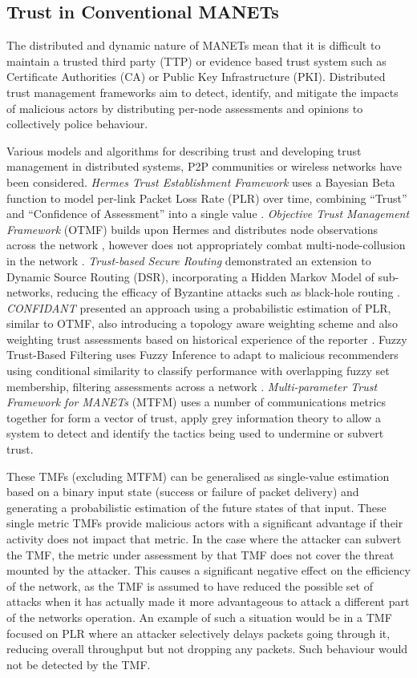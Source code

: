 \documentclass{aamas2016}
\begin{document}
\subsection{Trust in Conventional MANETs}
The distributed and dynamic nature of MANETs mean that it is difficult to maintain a trusted third party (TTP) or evidence based trust system such as Certificate Authorities (CA) or Public Key Infrastructure (PKI). 
Distributed trust management frameworks aim to detect, identify, and mitigate the impacts of malicious actors by distributing per-node assessments and opinions to collectively police behaviour. 

Various models and algorithms for describing trust and developing trust management in distributed systems, P2P communities or wireless networks have been considered.
\textit{Hermes Trust Establishment Framework} uses a Bayesian Beta function to model per-link Packet Loss Rate (PLR) over time, combining ``Trust'' and ``Confidence of Assessment'' into a single value \cite{Zouridaki2005}.
\textit{Objective Trust Management Framework} (OTMF) builds upon Hermes and distributes node observations across the network \cite{Li2008}, however does not appropriately combat multi-node-collusion in the network \cite{Cho2011}. 
\textit{Trust-based Secure Routing} demonstrated an extension to Dynamic Source Routing (DSR), incorporating a Hidden Markov Model of sub-networks, reducing the efficacy of Byzantine attacks such as black-hole routing  \cite{Moe2008a}. 
\textit{CONFIDANT} presented an approach using a probabilistic estimation of PLR, similar to OTMF, also introducing a topology aware weighting scheme and also weighting trust assessments based on historical experience of the reporter \cite{Buchegger2002}. Fuzzy Trust-Based Filtering uses Fuzzy Inference to adapt to malicious recommenders using conditional similarity to classify performance with overlapping fuzzy set membership, filtering assessments across a network \cite{Luo2008}.
\textit{Multi-parameter Trust Framework for MANETs} (MTFM) uses a number of communications metrics together for form a vector of trust, apply grey information theory to allow a system to detect and identify the tactics being used to undermine or subvert trust\cite{Guo11}.

These TMFs (excluding MTFM) can be generalised as single-value estimation based on a binary input state (success or failure of packet delivery) and generating a probabilistic estimation of the future states of that input. 
These single metric TMFs provide malicious actors with a significant advantage if their activity does not impact that metric.
In the case where the attacker can subvert the TMF, the metric under assessment by that TMF does not cover the threat mounted by the attacker. 
This causes a significant negative effect on the efficiency of the network, as the TMF is assumed to have reduced the possible set of attacks when it has actually made it more advantageous to attack a different part of the networks operation.
An example of such a situation would be in a TMF focused on PLR where an attacker selectively delays packets going through it, reducing overall throughput but not dropping any packets. Such behaviour would not be detected by the TMF.
\end{document}
